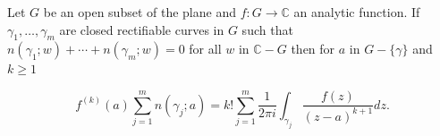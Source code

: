 Let $G$ be an open subset of the plane and $f: G \to \mathbb{C}$ an analytic function. If $\gamma_1, \ldots, \gamma_m$ are closed rectifiable curves in $G$ such that $n(\gamma_1; w) + \cdots + n(\gamma_m; w) = 0$ for all $w$ in $\mathbb{C} - G$ then for $a$ in $G - \{\gamma\}$ and $k \geq 1$

$$f^{(k)}(a) \sum_{j=1}^{m} n(\gamma_j; a) = k! \sum_{j=1}^{m} \frac{1}{2\pi i} \int_{\gamma_j} \frac{f(z)}{(z-a)^{k+1}} dz.$$
